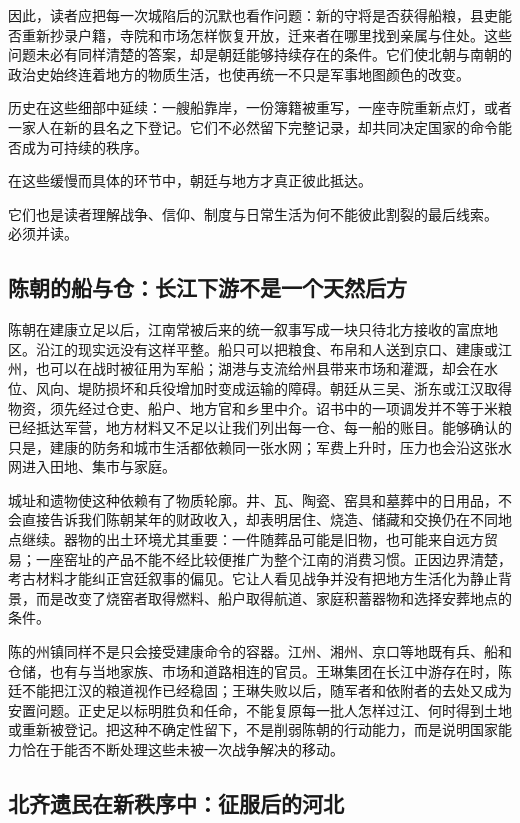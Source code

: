 因此，读者应把每一次城陷后的沉默也看作问题：新的守将是否获得船粮，县吏能否重新抄录户籍，寺院和市场怎样恢复开放，迁来者在哪里找到亲属与住处。这些问题未必有同样清楚的答案，却是朝廷能够持续存在的条件。它们使北朝与南朝的政治史始终连着地方的物质生活，也使再统一不只是军事地图颜色的改变。

历史在这些细部中延续：一艘船靠岸，一份簿籍被重写，一座寺院重新点灯，或者一家人在新的县名之下登记。它们不必然留下完整记录，却共同决定国家的命令能否成为可持续的秩序。

在这些缓慢而具体的环节中，朝廷与地方才真正彼此抵达。

它们也是读者理解战争、信仰、制度与日常生活为何不能彼此割裂的最后线索。
必须并读。

\subsection{陈朝的船与仓：长江下游不是一个天然后方}

陈朝在建康立足以后，江南常被后来的统一叙事写成一块只待北方接收的富庶地区。沿江的现实远没有这样平整。船只可以把粮食、布帛和人送到京口、建康或江州，也可以在战时被征用为军船；湖港与支流给州县带来市场和灌溉，却会在水位、风向、堤防损坏和兵役增加时变成运输的障碍。朝廷从三吴、浙东或江汉取得物资，须先经过仓吏、船户、地方官和乡里中介。诏书中的一项调发并不等于米粮已经抵达军营，地方材料又不足以让我们列出每一仓、每一船的账目。能够确认的只是，建康的防务和城市生活都依赖同一张水网；军费上升时，压力也会沿这张水网进入田地、集市与家庭。

城址和遗物使这种依赖有了物质轮廓。井、瓦、陶瓷、窑具和墓葬中的日用品，不会直接告诉我们陈朝某年的财政收入，却表明居住、烧造、储藏和交换仍在不同地点继续。器物的出土环境尤其重要：一件随葬品可能是旧物，也可能来自远方贸易；一座窑址的产品不能不经比较便推广为整个江南的消费习惯。正因边界清楚，考古材料才能纠正宫廷叙事的偏见。它让人看见战争并没有把地方生活化为静止背景，而是改变了烧窑者取得燃料、船户取得航道、家庭积蓄器物和选择安葬地点的条件。

陈的州镇同样不是只会接受建康命令的容器。江州、湘州、京口等地既有兵、船和仓储，也有与当地家族、市场和道路相连的官员。王琳集团在长江中游存在时，陈廷不能把江汉的粮道视作已经稳固；王琳失败以后，随军者和依附者的去处又成为安置问题。正史足以标明胜负和任命，不能复原每一批人怎样过江、何时得到土地或重新被登记。把这种不确定性留下，不是削弱陈朝的行动能力，而是说明国家能力恰在于能否不断处理这些未被一次战争解决的移动。

\subsection{北齐遗民在新秩序中：征服后的河北}

